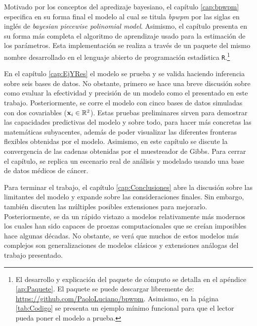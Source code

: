 \documentclass[../Main/Main.tex]{subfiles}
\begin{document}
Motivado por los conceptos del apredizaje bayesiano, el capítulo \ref{cap:bpwpm} especifica en su forma final el modelo al cual se titula \emph{bpwpm} por las siglas en inglés de \textit{bayesian piecewise polinomial model}. Asimismo, el capítulo presenta en su forma más completa el algoritmo de aprendizaje usado para la estimación de los parámetros. Esta implementación se realiza a través de un paquete del mismo nombre desarrollado en el lenguaje abierto de programación estadística \verb|R|.\footnote{El desarrollo y explicación del paquete de cómputo se detalla en el apéndice \ref{ap:Paquete}. El paquete se puede descargar libremente de: \url{https://github.com/PaoloLuciano/bpwpm}. Asimismo, en la página \ref{tab:Codigo} se presenta un ejemplo mínimo funcional para que el lector pueda poner el modelo a prueba.}

En el capítulo \ref{cap:EjYRes} el modelo se prueba y se valida haciendo inferencia sobre seis bases de datos. No obstante, primero se hace una breve discusión sobre como evaluar la efectividad y precisión de un modelo como el presentado en este trabajo. Posteriormente, se corre el modelo con cinco bases de datos simuladas con dos covariables ($\mathbf{x}_i \in \mathbb{R}^2$). Estas pruebas preliminares sirven para demostrar las capacidades predictivas del modelo y sobre todo, para hacer más concretas las matemáticas subyacentes, además de poder visualizar las diferentes fronteras flexibles obtenidas por el modelo. Asimismo, en este capítulo se discute la convergencia de las cadenas obtenidas por el muestreador de Gibbs. Para cerrar el capítulo, se replica un escenario real de análisis y modelado usando una base de datos médicos de cáncer.

Para terminar el trabajo, el capítulo \ref{cap:Conclusiones} abre la discusión sobre las limitantes del modelo y expande sobre las consideraciones finales. Sin embargo, también discuten las múltiples posibles extensiones para mejorarlo. Posteriormente, se da un rápido vistazo a modelos relativamente más modernos los cuales han sido capaces de proezas computacionales que se creían imposibles hace algunas décadas. No obstante, se verá que muchos de estos modelos más complejos son generalizaciones de modelos clásicos y extensiones análogas del trabajo presentado. 
\end{document}
